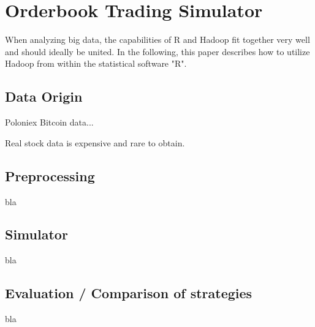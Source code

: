 
\chapter{Orderbook Trading Simulator}
\label{chap:simulator}
When analyzing big data, the capabilities of R and Hadoop fit together very well and should ideally be united. In the following, this paper describes how to utilize Hadoop from within the statistical software "R". 

\section{Data Origin}
Poloniex Bitcoin data...

Real stock data is expensive and rare to obtain.

\section{Preprocessing}
bla

\section{Simulator}
bla

\section{Evaluation / Comparison of strategies}
bla

\clearpage{}